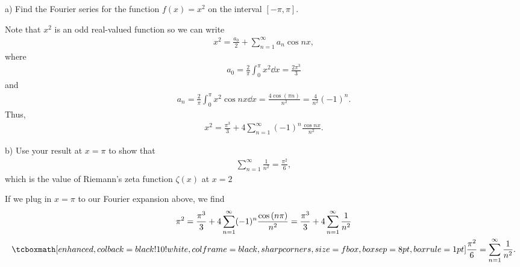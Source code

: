 a) Find the Fourier series for the function $f(x) = x^2$ on the interval $[-\pi,\pi]$.

Note that $x^2$ is an odd real-valued function so we can write
\begin{eqnarray}
    \label{eq:x2-fourier}
    x^2 = \frac{a_0}{2} + \sum_{n=1}^{\infty} a_{n}\cos{nx}
,\end{eqnarray}
where
\begin{eqnarray}
    \label{eq:a0_x2}
    a_0 = \frac{2}{\pi} \int_{0}^{\pi} x^2 \dd{x} = \frac{2\pi^3}{3}
\end{eqnarray}
and
\begin{eqnarray}
    \label{eq:an_x2}
    a_{n} = \frac{2}{\pi} \int_{0}^{\pi} x^2\cos{nx} \dd{x} = \frac{4 \cos{(\pi n)}}{n^2} = \frac{4}{n^2}(-1)^{n}
.\end{eqnarray}
Thus,
\begin{eqnarray}
    \label{eq:x2-fourier-1}
    x^2 = \frac{\pi^3}{3} + 4 \sum_{n=1}^{\infty} (-1)^{n}\frac{\cos{nx}}{n^2}
.\end{eqnarray}


b) Use your result at $x = \pi$ to show that 
\begin{eqnarray}
    \label{eq:3.175}
    \sum_{n=1}^{\infty} \frac{1}{n^2} = \frac{\pi^2}{6}
,\end{eqnarray}
which is the value of Riemann's zeta function $\zeta(x)$ at $x = 2$

If we plug in $x = \pi$ to our Fourier expansion above, we find
\begin{gather}
    \label{eq:x-pi-sum}
    \pi^2 = \frac{\pi^3}{3} + 4 \sum_{n=1}^{\infty} (-1)^{n} \frac{\cos{(n\pi)}}{n^2} = \frac{\pi^3}{3} + 4 \sum_{n=1}^{\infty} \frac{1}{n^2} \notag \\
    \eqbox{
    \frac{\pi^2}{6} = \sum_{n=1}^{\infty} \frac{1}{n^2}
}
.\end{gather}



